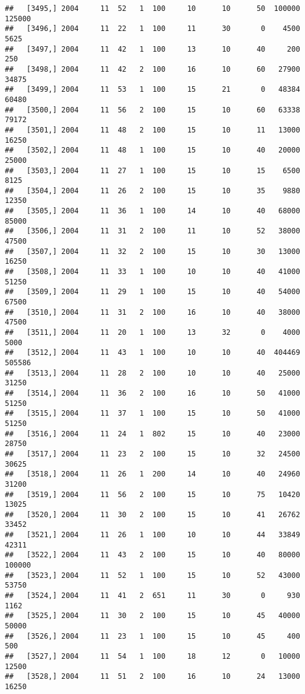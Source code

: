 \documentclass{article}\usepackage[]{graphicx}\usepackage[]{color}
\makeatletter
\newenvironment{kframe}{%
 \def\at@end@of@kframe{}%
 \ifinner\ifhmode%
  \def\at@end@of@kframe{\end{minipage}}%
  \begin{minipage}{\columnwidth}%
 \fi\fi%
 \def\FrameCommand##1{\hskip\@totalleftmargin \hskip-\fboxsep
 \colorbox{shadecolor}{##1}\hskip-\fboxsep
     \hskip-\linewidth \hskip-\@totalleftmargin \hskip\columnwidth}%
 \MakeFramed {\advance\hsize-\width
   \@totalleftmargin\z@ \linewidth\hsize
   \@setminipage}}%
 {\par\unskip\endMakeFramed%
 \at@end@of@kframe}
\newenvironment{knitrout}{}{} %
\makeatother
\begin{document}
\begin{knitrout}
\begin{kframe}
\begin{verbatim}
##   [3495,] 2004     11  52   1  100     10      10      50  100000  125000
##   [3496,] 2004     11  22   1  100     11      30       0    4500    5625
##   [3497,] 2004     11  42   1  100     13      10      40     200     250
##   [3498,] 2004     11  42   2  100     16      10      60   27900   34875
##   [3499,] 2004     11  53   1  100     15      21       0   48384   60480
##   [3500,] 2004     11  56   2  100     15      10      60   63338   79172
##   [3501,] 2004     11  48   2  100     15      10      11   13000   16250
##   [3502,] 2004     11  48   1  100     15      10      40   20000   25000
##   [3503,] 2004     11  27   1  100     15      10      15    6500    8125
##   [3504,] 2004     11  26   2  100     15      10      35    9880   12350
##   [3505,] 2004     11  36   1  100     14      10      40   68000   85000
##   [3506,] 2004     11  31   2  100     11      10      52   38000   47500
##   [3507,] 2004     11  32   2  100     15      10      30   13000   16250
##   [3508,] 2004     11  33   1  100     10      10      40   41000   51250
##   [3509,] 2004     11  29   1  100     15      10      40   54000   67500
##   [3510,] 2004     11  31   2  100     16      10      40   38000   47500
##   [3511,] 2004     11  20   1  100     13      32       0    4000    5000
##   [3512,] 2004     11  43   1  100     10      10      40  404469  505586
##   [3513,] 2004     11  28   2  100     10      10      40   25000   31250
##   [3514,] 2004     11  36   2  100     16      10      50   41000   51250
##   [3515,] 2004     11  37   1  100     15      10      50   41000   51250
##   [3516,] 2004     11  24   1  802     15      10      40   23000   28750
##   [3517,] 2004     11  23   2  100     15      10      32   24500   30625
##   [3518,] 2004     11  26   1  200     14      10      40   24960   31200
##   [3519,] 2004     11  56   2  100     15      10      75   10420   13025
##   [3520,] 2004     11  30   2  100     15      10      41   26762   33452
##   [3521,] 2004     11  26   1  100     10      10      44   33849   42311
##   [3522,] 2004     11  43   2  100     15      10      40   80000  100000
##   [3523,] 2004     11  52   1  100     15      10      52   43000   53750
##   [3524,] 2004     11  41   2  651     11      30       0     930    1162
##   [3525,] 2004     11  30   2  100     15      10      45   40000   50000
##   [3526,] 2004     11  23   1  100     15      10      45     400     500
##   [3527,] 2004     11  54   1  100     18      12       0   10000   12500
##   [3528,] 2004     11  51   2  100     16      10      24   13000   16250

\end{verbatim}
\end{kframe}
\end{knitrout}
\end{document}
